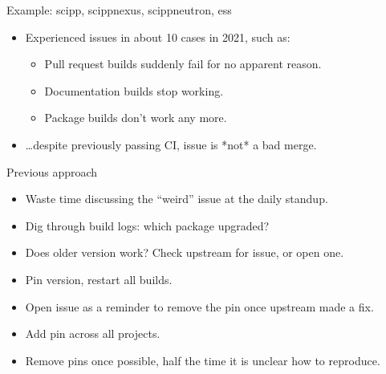 \documentclass[english,aspectratio=169,smaller]{beamer}
\begin{document}
\begin{frame}
  \begin{block}{Example: scipp, scippnexus, scippneutron, ess}
    \begin{itemize}
      \item Experienced issues in about 10 cases in 2021, such as:
        \begin{itemize}
          \item Pull request builds suddenly fail for no apparent reason.
          \item Documentation builds stop working.
          \item Package builds don't work any more.
        \end{itemize}
      \item \alert{\dots despite previously passing CI}, issue is *not* a bad merge.
    \end{itemize}
  \end{block}
  \begin{block}{Previous approach}
    \begin{itemize}
      \item Waste time discussing the ``weird'' issue at the daily standup.
      \item Dig through build logs: which package upgraded?
      \item Does older version work? Check upstream for issue, or open one.
      \item Pin version, restart all builds.
      \item Open issue as a reminder to remove the pin once upstream made a fix.
      \item Add pin across all projects.
      \item Remove pins once possible, half the time it is unclear how to reproduce.
    \end{itemize}
  \end{block}
\end{frame}
\end{document}
